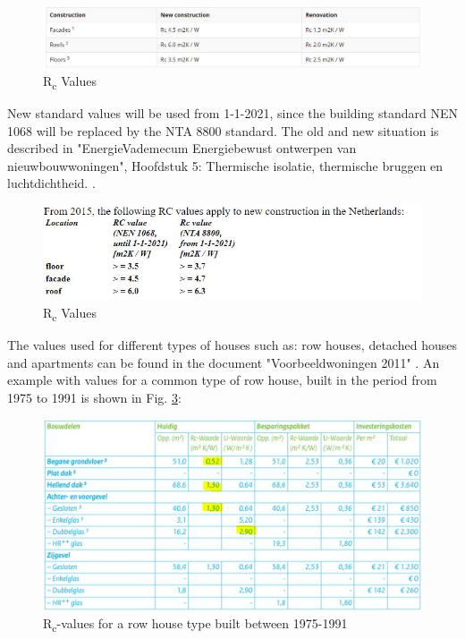 \begin{figure}[H]
	\centering
	\includegraphics[width=1.0\columnwidth]{Pictures/Rc_values_2020.JPG}
	\caption[Short title]{R\textsubscript{c} Values \cite{ISOL}}
	\label{fig:Rcvalues}
\end{figure}

New standard values will be used from 1-1-2021, since the building standard NEN 1068 will be replaced by the NTA 8800 standard. The old and new situation is described in "EnergieVademecum Energiebewust ontwerpen van nieuwbouwwoningen", Hoofdstuk 5: Thermische isolatie, thermische bruggen en luchtdichtheid.
\cite{ISSO}.

\begin{figure}[H]
	\centering
	\includegraphics[width=1.0\columnwidth]{Pictures/Rc_values_2021.JPG}
	\caption[Short title]{R\textsubscript{c} Values \cite{RVALUE}}
	\label{fig:newRc}
\end{figure}

The values used for different types of houses such as: row houses, detached houses and apartments can be found in the document "Voorbeeldwoningen 2011" \cite{VOORBEELD}. An example with values for a common type of row house, built in the period from 1975 to 1991 is shown in Fig. \ref{row_house}:


\begin{figure}[H]
	\centering
	\includegraphics[width=0.8\columnwidth]{Pictures/row_house_1975-1991.JPG}
	\caption[Short title]{R\textsubscript{c}-values for a row house type built between 1975-1991 \cite{VOORBEELD}}
	\label{row_house}
\end{figure} 
\newpage

